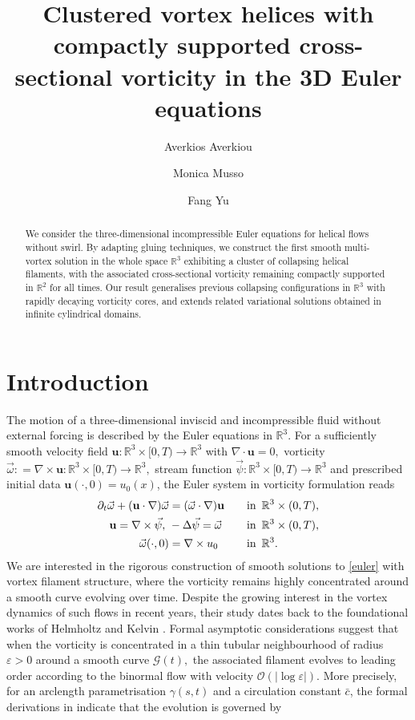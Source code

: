 \documentclass[11pt,reqno,a4paper]{amsart}
\title[Clustered vortex helices with compactly supported cross-sectional vorticity]{Clustered vortex helices with compactly supported cross-sectional vorticity in the 3D Euler equations}
\author[A.~Averkiou]{Averkios Averkiou}
\author[M.~Musso]{Monica Musso}
\author[F.~Yu]{Fang Yu}
\numberwithin{equation}{section}
\newcommand{\R}{\mathbb{R}}
\newcommand{\defeq}{\mathrel{\mathop:}=}
\newcommand{\inn}{{\quad\hbox{in } }}
\newcommand{\ve}{\varepsilon}
\begin{document}
\begin{abstract}
We consider the three-dimensional incompressible Euler equations for helical flows without swirl. By adapting gluing techniques, we construct the first smooth multi-vortex solution in the whole space $\mathbb{R}^3$ exhibiting a cluster of collapsing helical filaments, with the associated cross-sectional vorticity remaining compactly supported in $\mathbb{R}^2$
 for all times. Our result generalises previous collapsing configurations in $\mathbb{R}^3$ with rapidly decaying vorticity cores, and extends related variational solutions obtained in infinite cylindrical domains.
\end{abstract}
\maketitle
\section{Introduction}
The motion of a three-dimensional inviscid and incompressible fluid without external forcing is described by the Euler equations in $\R^3$. For a sufficiently smooth velocity field $\mathbf{u}: \R^3\times [0,T) \to \R^3$ with $\nabla\cdot \mathbf{u} =0,$ vorticity $\vec{\omega}\defeq \nabla\times{\mathbf{u}}: \R^3\times [0,T) \to \R^3,$ stream function $\vec{\psi}: \R^3 \times [0,T) \to \R^3$ and prescribed initial data $\mathbf{u}(\cdot,0)=u_0(x)$, the Euler system in vorticity formulation reads
\begin{equation}
\label{euler}
\begin{aligned}
\partial_{t}\vec \omega  +
(\mathbf{u}\cdot \nabla){\vec \omega}
&=( \vec \omega \cdot \nabla)\mathbf {u}  &&  \inn \, \R^3\times (0,T), \\
\quad \mathbf{u}  = \nabla \times \vec {\psi},\ &
-\Delta \vec \psi =  \vec \omega  && \inn \, \R^3\times (0,T),\\
{\vec \omega}(\cdot,0)  &=  \nabla \times u_0 && \inn \, \R^3.
\end{aligned}
\end{equation}
We are interested in the rigorous construction of smooth solutions to \eqref{euler} with vortex filament structure, where the vorticity remains highly concentrated around a smooth curve evolving over time. Despite the growing interest in the vortex dynamics of such flows in recent years, their study dates back to the foundational works of Helmholtz and Kelvin \cites{MR1579057,thomson1868vi}. Formal asymptotic considerations suggest that when the vorticity is concentrated in a thin tubular neighbourhood of radius $\ve>0$ around a smooth curve $\mathcal{G}(t),$ the associated filament evolves to leading order according to the binormal flow with velocity  $\mathcal{O}\left(|\log\ve|\right)$. More precisely, for an arclength parametrisation $\gamma(s,t)$ and a circulation constant $\bar c$, the formal derivations in \cites{da1906sul, levi1908sull}  indicate that the evolution is governed by
\end{document}

